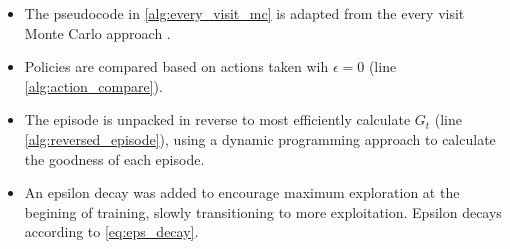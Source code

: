 \documentclass[letterpaper]{article} %
\begin{document}
\begin{enumerate}

	\begin{itemize}
	    \item The pseudocode in \ref{alg:every_visit_mc} is adapted from the every visit Monte Carlo approach \cite{SuttonBartoRLBook}.
	    \item Policies are compared based on actions taken wih $\epsilon=0$ (line \ref{alg:action_compare}).
	    \item The episode is unpacked in reverse to most efficiently calculate $G_t$ (line \ref{alg:reversed_episode}), using a dynamic programming approach to calculate the goodness of each episode.
	    \item An epsilon decay was added to encourage maximum exploration at the begining of training, slowly transitioning to more exploitation. Epsilon decays according to \ref{eq:eps_decay}.
	\end{itemize}


\end{enumerate}
\end{document}
